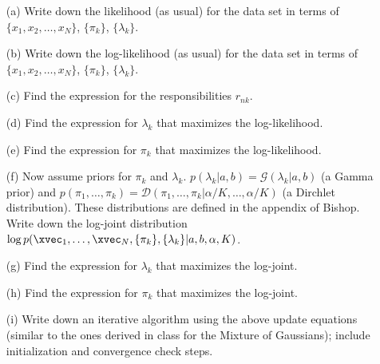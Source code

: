 \documentclass[12pt,a4paper]{article}
\begin{document}
\newcommand{\x}{\xvec}
\begin{enumerate}
	\item[(a)] Write down the likelihood (as usual) for the data set in terms of $\{x_1, x_2, \ldots, x_N\}$, $\{\pi_k\}$, $\{\lambda_k\}$.
	\item[(b)] Write down the log-likelihood (as usual) for the data set in terms of $\{x_1, x_2, \ldots, x_N\}$, $\{\pi_k\}$, $\{\lambda_k\}$.
	\item[(c)] Find the expression for the responsibilities $r_{nk}$.
	\item[(d)] Find the expression for $\lambda_k$ that maximizes the log-likelihood. 
	\item[(e)] Find the expression for $\pi_k$ that maximizes the log-likelihood. 
  \item[(f)] Now assume priors for $\pi_k$ and $\lambda_k$.  $p(\lambda_k | a, b ) = \mathcal{G}(\lambda_k | a,b )$ (a Gamma prior) and $p(\pi_1, \ldots, \pi_k) = \mathcal{D}(\pi_1, \ldots, \pi_k | \alpha/K, \ldots, \alpha/K)$ (a Dirchlet distribution).  These distributions are defined in the appendix of Bishop.  Write down the log-joint distribution \\$\log p(\x_1, \ldots, \x_N, \{\pi_k\}, \{\lambda_k\} | a, b, \alpha, K)$.
	\item[(g)] Find the expression for $\lambda_k$ that maximizes the log-joint. 
	\item[(h)] Find the expression for $\pi_k$ that maximizes the log-joint.
	\item[(i)] Write down an iterative algorithm using the above update equations (similar to the ones derived in class for the Mixture of Gaussians); include initialization and convergence check steps.
\end{enumerate}
\end{document}
